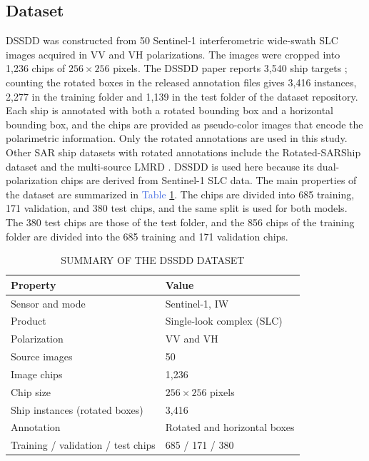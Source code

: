 \documentclass[conference]{IEEEtran}
\begin{document}
\subsection{Dataset}
DSSDD \cite{hu2021dssdd} was constructed from 50 Sentinel-1 interferometric wide-swath SLC images acquired in VV and VH polarizations. The images were cropped into 1,236 chips of $256 \times 256$ pixels. The DSSDD paper reports 3,540 ship targets \cite{hu2021dssdd}; counting the rotated boxes in the released annotation files gives 3,416 instances, 2,277 in the training folder and 1,139 in the test folder of the dataset repository. Each ship is annotated with both a rotated bounding box and a horizontal bounding box, and the chips are provided as pseudo-color images that encode the polarimetric information. Only the rotated annotations are used in this study. Other SAR ship datasets with rotated annotations include the Rotated-SARShip dataset \cite{xu2022rssd} and the multi-source LMRD \cite{cheng2026lmrd}. DSSDD is used here because its dual-polarization chips are derived from Sentinel-1 SLC data. The main properties of the dataset are summarized in \textcolor{RoyalBlue}{Table} \ref{tab:dataset}. The chips are divided into 685 training, 171 validation, and 380 test chips, and the same split is used for both models. The 380 test chips are those of the test folder, and the 856 chips of the training folder are divided into the 685 training and 171 validation chips.
\begin{table}[h!]
	\centering
	\caption{SUMMARY OF THE DSSDD DATASET}
	\begin{footnotesize}
	\begin{tabular}{ll}
		\hline
		\textbf{Property} & \textbf{Value} \\
		\hline
		Sensor and mode & Sentinel-1, IW \\
		Product & Single-look complex (SLC) \\
		Polarization & VV and VH \\
		Source images & 50 \\
		Image chips & 1,236 \\
		Chip size & $256 \times 256$ pixels \\
		Ship instances (rotated boxes) & 3,416 \\
		Annotation & Rotated and horizontal boxes \\
		Training / validation / test chips & 685 / 171 / 380 \\
		\hline
	\end{tabular}
	\label{tab:dataset}
	\end{footnotesize}
\end{table}
\end{document}
